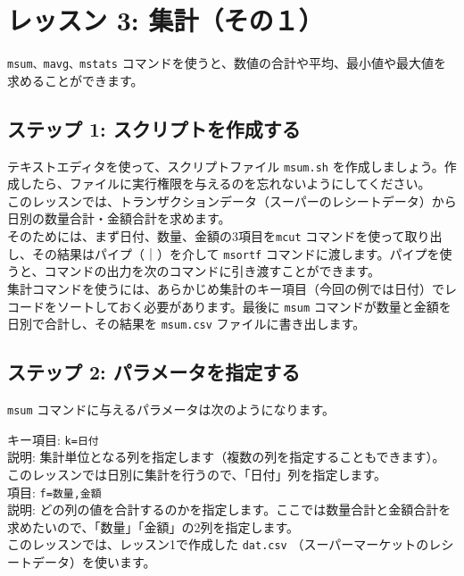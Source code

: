 

%

\section{レッスン 3: 集計（その１）}

\verb|msum、mavg、mstats| コマンドを使うと、数値の合計や平均、最小値や最大値を求めることができます。

\subsection{ステップ 1: スクリプトを作成する}

テキストエディタを使って、スクリプトファイル \verb|msum.sh| を作成しましょう。作成したら、ファイルに実行権限を与えるのを忘れないようにしてください。\\

このレッスンでは、トランザクションデータ（スーパーのレシートデータ）から日別の数量合計・金額合計を求めます。\\

そのためには、まず日付、数量、金額の3項目を\verb|mcut| コマンドを使って取り出し、その結果はパイプ（｜）を介して \verb|msortf| コマンドに渡します。パイプを使うと、コマンドの出力を次のコマンドに引き渡すことができます。\\
集計コマンドを使うには、あらかじめ集計のキー項目（今回の例では日付）でレコードをソートしておく必要があります。最後に \verb|msum| コマンドが数量と金額を日別で合計し、その結果を \verb|msum.csv| ファイルに書き出します。

\subsection{ステップ 2: パラメータを指定する}

{\setlength{\parindent}{0cm}

\verb|msum| コマンドに与えるパラメータは次のようになります。

キー項目: 		\verb|k=日付| \\
説明: 集計単位となる列を指定します（複数の列を指定することもできます）。このレッスンでは日別に集計を行うので、「日付」列を指定します。\\

項目: 	\verb|f=数量,金額| \\
説明: どの列の値を合計するのかを指定します。ここでは数量合計と金額合計を求めたいので、「数量」「金額」の2列を指定します。\\

このレッスンでは、レッスン1で作成した \verb|dat.csv| （スーパーマーケットのレシートデータ）を使います。
}

